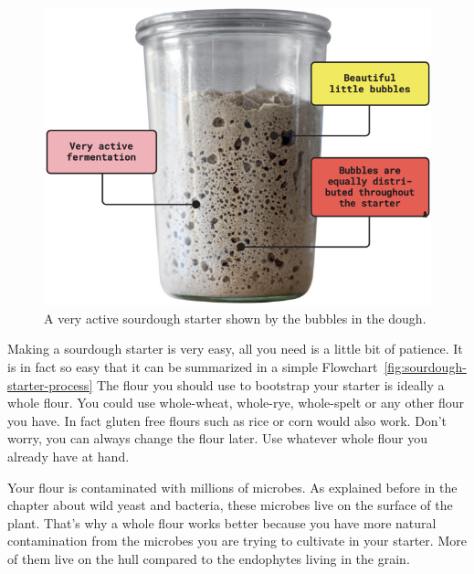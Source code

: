 \begin{figure}[!htb]
  \centering
  \includegraphics[width=\textwidth]{sourdough-starter-activity-indicators}
  \caption[Very active sourdough]{A very active sourdough starter shown by the
      bubbles in the dough.}%
  \label{fig:sourdough-starter}
\end{figure}

Making a sourdough starter is very easy, all you need
is a little bit of patience. It is in fact so easy that it can be summarized
in a simple Flowchart~\ref{fig:sourdough-starter-process} The flour you should
use to bootstrap your starter is ideally a whole flour.
You could use whole-wheat, whole-rye, whole-spelt or
any other flour you have. In fact gluten free flours such
as rice or corn would also work. Don't worry, you can always
change the flour later. Use whatever whole flour you
already have at hand.

\begin{flowchart}[!htb]
\centering
  
  \caption[The full sourdough starter process]{The process of making a sourdough
      starter from scratch.}%
  \label{fig:sourdough-starter-process}
\end{flowchart}

Your flour is contaminated with millions of microbes. As explained
before in the chapter about wild yeast and bacteria, these
microbes live on the surface of the plant. That's why
a whole flour works better because you have more natural
contamination from the microbes you are trying to cultivate
in your starter. More of them live on the hull compared to the
endophytes living in the grain.

